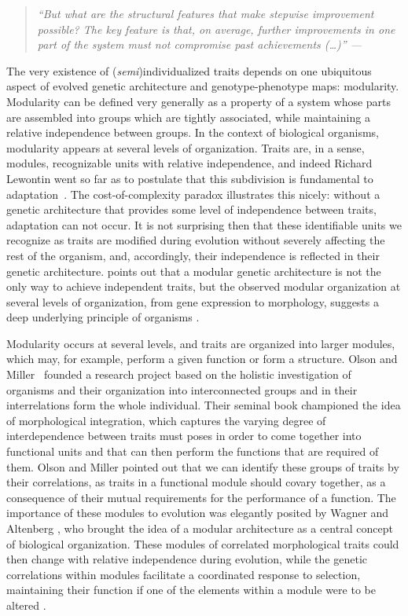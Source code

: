 \begin{refsection}
\begin{quote}
\textit{
``But what are the structural features that make stepwise improvement
possible? The key feature is that, on average, further improvements in
one part of the system must not compromise past achievements (\ldots{})''
--- \textcite{Wagner1996-ui}}
\end{quote}

The very existence of (\emph{semi})individualized traits depends on one
ubiquitous aspect of evolved genetic architecture and genotype-phenotype
maps: modularity. Modularity can
be defined very generally as a property of a system whose parts are
assembled into groups which are tightly associated, while maintaining a
relative independence between groups. In the context of biological
organisms, modularity appears at several levels of organization. Traits
are, in a sense, modules, recognizable units with relative independence,
and indeed Richard Lewontin went so far as to postulate that this
subdivision is fundamental to adaptation~\parencite{Lewontin1979-iw}. The
cost-of-complexity paradox illustrates this nicely: without a genetic
architecture that provides some level of independence between traits,
adaptation can not occur. It is not surprising then that these
identifiable units we recognize as traits are modified during evolution
without severely affecting the rest of the organism, and, accordingly,
their independence is reflected in their genetic architecture. 
\textcite{Hansen2003-fh} points out that a modular genetic architecture is
not the only way to achieve independent traits, but the observed modular
organization at several levels of organization, from gene expression to
morphology, suggests a deep underlying principle of organisms
\parencite{Wagner2007-cx}.

Modularity occurs at several levels, and traits are organized into
larger modules, which may, for example, perform a given function or form
a structure. Olson and Miller~\parencite*{Olson1958-qk} founded a research
project based on the holistic investigation of organisms and their
organization into interconnected groups and in their interrelations form
the whole individual. Their seminal book championed the idea of
morphological integration, which captures the varying degree of
interdependence between traits must poses in order to come together into
functional units and that can then perform the functions that are
required of them. Olson and Miller pointed out that we can identify
these groups of traits by their correlations, as traits in a functional
module should covary together, as a consequence of their mutual
requirements for the performance of a function. The importance of these
modules to evolution was elegantly posited by Wagner and Altenberg
\parencite*{Wagner1996-ui}, who brought the idea of a modular architecture as
a central concept of biological organization. These modules of
correlated morphological traits could then change with relative
independence during evolution, while the genetic correlations within
modules facilitate a coordinated response to selection, maintaining
their function if one of the elements within a module were to be altered
\parencite{Cheverud1984-mi, Cheverud1982-op}.


\end{refsection}
